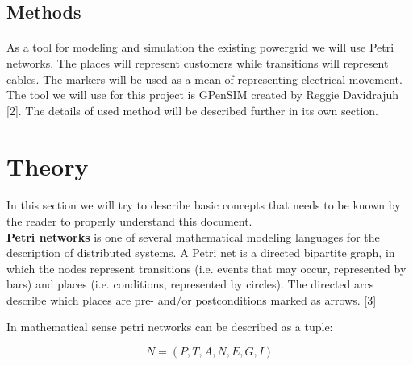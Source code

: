 \documentclass[a4paper]{article}
\begin{document}
\subsection{Methods}
\paragraph{}
As a tool for modeling and simulation the existing powergrid we will use Petri networks. The places will represent customers while transitions will represent cables. The markers will be used as a mean of representing electrical movement. The tool we will use for this project is GPenSIM created by Reggie Davidrajuh [2]. The details of used method will be described further in its own section.

\clearpage

%
\section{Theory}
\paragraph{}
In this section we will try to describe basic concepts that needs to be known by the reader to properly understand this document.\\

\textbf{Petri networks} is one of several mathematical modeling languages for the description of distributed systems. A Petri net is a directed bipartite graph, in which the nodes represent transitions (i.e. events that may occur, represented by bars) and places (i.e. conditions, represented by circles). The directed arcs describe which places are pre- and/or postconditions marked  as arrows. [3]

In mathematical sense petri networks can be described as a tuple:

\begin{equation}
N = (P, T, A, N, E, G, I )
\end{equation}
\end{document}

